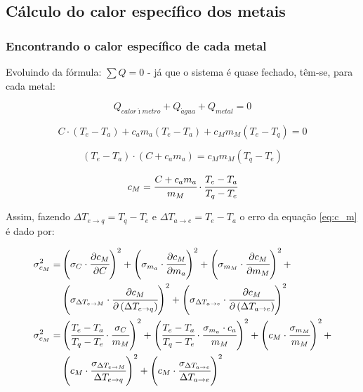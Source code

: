 \documentclass[a4paper]{article}
\begin{document}
		\subsection{Cálculo do calor específico dos metais}


			\subsubsection{Encontrando o calor específico de cada metal}

				Evoluindo da fórmula: $\sum Q=0$ - já que o sistema é quase fechado,
				têm-se, para cada metal:

				\begin{equation}
					Q_{calor\acute{\imath}metro}+Q_{\acute{a}gua}+Q_{metal}=0
				\end{equation}


				\[
					C\cdot\left(T_{e}-T_{a}\right)+c_{a}m_{a}\left(T_{e}-T_{a}\right)+c_{M}m_{M}\left(T_{e}-T_{q}\right)=0
				\]


				\[
					\left(T_{e}-T_{a}\right)\cdot\left(C+c_{a}m_{a}\right)=c_{M}m_{M}\left(T_{q}-T_{e}\right)
				\]


				\begin{equation}
					c_{M}=\cfrac{C+c_{a}m_{a}}{m_{M}}\cdot\cfrac{T_{e}-T_{a}}{T_{q}-T_{e}}\label{eq:c_m}
				\end{equation}


				Assim, fazendo $\Delta T_{e\rightarrow q}=T_{q}-T_{e}$ e $\Delta T_{a\rightarrow e}=T_{e}-T_{a}$
				o erro da equação \eqref{eq:c_m} é dado por:

				\begin{align*}
					\sigma_{c_{M}}^{2} = &
						\left(\sigma_{C}\cdot\cfrac{\partial c_{M}}{\partial C}\right)^{2}+
						\left(\sigma_{m_{a}}\cdot\cfrac{\partial c_{M}}{\partial m_{a}}\right)^{2}+
						\left(\sigma_{m_{M}}\cdot\cfrac{\partial c_{M}}{\partial m_{M}}\right)^{2}+
						\\ &
						\left(\sigma_{\Delta T_{e\rightarrow M}}\cdot\cfrac{\partial c_{M}}{\partial
							\left(\Delta T_{e\rightarrow q}\right)}\right)^{2}+
						\left(\sigma_{\Delta T_{a\rightarrow e}}\cdot\cfrac{\partial c_{M}}{\partial
							\left(\Delta T_{a\rightarrow e}\right)}\right)^{2}
                	\\
				    \sigma_{c_{M}}^{2} = & 
				        \left(\cfrac{T_{e}-T_{a}}{T_{q}-T_{e}}\cdot\cfrac{\sigma_{C}}{m_{M}}\right)^{2}+
						\left(\cfrac{T_{e}-T_{a}}{T_{q}-T_{e}}\cdot\cfrac{\sigma_{m_{a}}\cdot c_{a}}{m_{M}}\right)^{2}+
						\left(c_{M}\cdot\cfrac{\sigma_{m_{M}}}{m_{M}}\right)^{2}+ \\ &
						\left(c_{M}\cdot\cfrac{\sigma_{\Delta T_{e\rightarrow M}}}
						    {\Delta T_{e\rightarrow q}}\right)^{2}+
						\left(c_{M}\cdot\cfrac{\sigma_{\Delta T_{a\rightarrow e}}}
						    {\Delta T_{a\rightarrow e}}\right)^{2}
				\end{align*}
                
\end{document}
